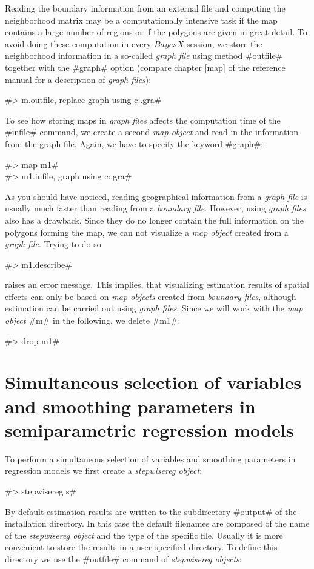 \documentclass[11pt,a4paper,twoside]{bayesxreport}
\begin{document}
Reading the boundary information from an external file and computing
the neighborhood matrix may be a computationally intensive task if
the map contains a large number of regions or if the polygons are
given in great detail. To avoid doing these computation in every
$BayesX$ session, we store the neighborhood information in a
so-called {\it graph file} using method #outfile# together with the
#graph# option (compare chapter \ref*{map} of the reference manual
for a description of {\em graph files}):

#> m.outfile, replace graph using c:\data\zambiasort.gra#

To see how storing maps in {\it graph files} affects the computation
time of the #infile# command, we create a second {\it map object}
and read in the information from the graph file. Again, we have to
specify the keyword #graph#:

#> map m1#\\
#> m1.infile, graph using c:\data\zambiasort.gra#

As you should have noticed, reading geographical information from a
{\it graph file} is usually much faster than reading from a {\it
boundary file}. However, using {\it graph files} also has a
drawback. Since they do no longer contain the full information on
the polygons forming the map, we can not visualize a {\it map
object} created from a {\it graph file}. Trying to do so

#> m1.describe#

raises an error message. This implies, that visualizing estimation
results of spatial effects can only be based on {\it map objects}
created from {\it boundary files}, although estimation can be
carried out using {\it graph files}. Since we will work with the
{\it map object} #m# in the following, we delete #m1#:

#> drop m1#

\section{Simultaneous selection of variables and smoothing parameters in semiparametric
regression models}\label{zambia_step_regression}

To perform a simultaneous selection of variables and smoothing
parameters in regression models we first create a {\it stepwisereg
object}:

#> stepwisereg s#

By default estimation results are written to the subdirectory
#output# of the installation directory. In this case the default
filenames are composed of the name of the {\it stepwisereg object}
and the type of the specific file. Usually it is more convenient to
store the results in a user-specified directory. To define this
directory we use the #outfile# command of {\it stepwisereg objects}:
\end{document}
